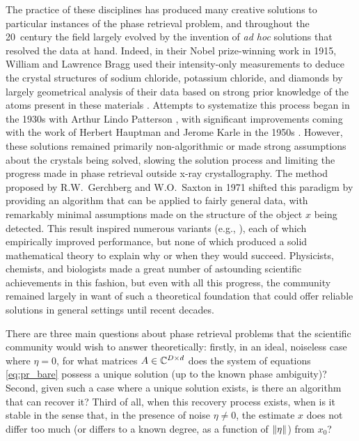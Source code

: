   The practice of these disciplines has produced many creative solutions to particular instances of the phase retrieval problem, and throughout the 20\th\ century the field largely evolved by the invention of \emph{ad hoc} solutions that resolved the data at hand.  Indeed, in their Nobel prize-winning work in 1915, William and Lawrence Bragg used their intensity-only measurements to deduce the crystal structures of sodium chloride, potassium chloride, and diamonds by largely geometrical analysis of their data based on strong prior knowledge of the atoms present in these materials \cite[pp.~88-92, 102-105]{bragg1915crystal_structure}.  Attempts to systematize this process began in the 1930s with Arthur Lindo Patterson \cite{patterson1934fourier_method}, with significant improvements coming with the work of Herbert Hauptman and Jerome Karle in the 1950s \cite{hauptman1953monograph}.  However, these solutions remained primarily non-algorithmic or made strong assumptions about the crystals being solved, slowing the solution process and limiting the progress made in phase retrieval outside x-ray crystallography.  The method proposed by R.W.~Gerchberg and W.O.~Saxton in 1971 \cite{gerchberg1972practical} shifted this paradigm by providing an algorithm that can be applied to fairly general data, with remarkably minimal assumptions made on the structure of the object $x$ being detected.  This result inspired numerous variants (e.g., \cite{bauschke2003hybrid,bauschke2002phase,elser2003phase,fienup1978reconstruction,takajo1997numerical,takajo1999further,takajo1998study}), each of which empirically improved performance, but none of which produced a solid mathematical theory to explain why or when they would succeed.  Physicists, chemists, and biologists made a great number of astounding scientific achievements in this fashion, but even with all this progress, the community remained largely in want of such a theoretical foundation that could offer reliable solutions in general settings until recent decades.
  
  There are three main questions about phase retrieval problems that the scientific community would wish to answer theoretically: firstly, in an ideal, noiseless case where $\eta = 0$, for what matrices $A \in \mathbb{C}^{D \times d}$ does the system of equations \eqref{eq:pr_bare} possess a unique solution (up to the known phase ambiguity)?  Second, given such a case where a unique solution exists, is there an algorithm that can recover it?  Third of all, when this recovery process exists, when is it stable in the sense that, in the presence of noise $\eta \neq 0$, the estimate $x$ does not differ too much (or differs to a known degree, as a function of $\lVert\eta\rVert$) from $x_0$?

